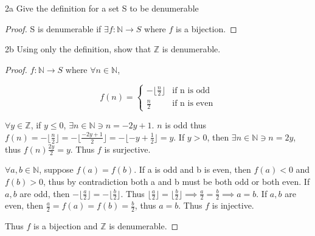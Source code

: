 \documentclass{article}
\newcommand{\Z}{\mathbb{Z}}
\newcommand{\N}{\mathbb{N}}
\newcommand{\floor}[1]{\lfloor{#1}\rfloor}
\begin{document}
\bigskip

\begin{PROB}{2a}\label{Problem 2a.}
    Give the definition for a set S to be denumerable
\end{PROB}
\begin{proof}
    S is denumerable if $\exists f: \N \to S$ where $f$ is a bijection.   
\end{proof}
\begin{claim}{2b}\label{Claim 2b.}
    Using only the definition, show that $\Z$ is denumerable.
\end{claim}
\begin{proof}
    $f: \N \to S$ where $\forall n \in \N$, 
    
    $$
    f(n) = \begin{cases}
        -\floor{\frac{n}{2}} & \text{if n is odd} \\
        \frac{n}{2} & \text{if n is even}
    \end{cases}
    $$ 


    $\forall y \in \Z$, if $y \leq 0$, $\exists n \in \N \ni n = -2y + 1$. $n$ is odd thus $f(n) = -\floor{\frac{n}{2}} = -\floor{\frac{-2y + 1}{2}} = -\floor{-y + \frac{1}{2}} = y$. If $y > 0$, then $\exists n \in \N \ni n = 2y$, thus $f(n)  \frac{2y}{2} = y$. Thus $f$ is surjective. 
    
    $\forall a, b \in \N$, suppose $f(a) = f(b)$. If a is odd and b is even, then $f(a) < 0$ and $f(b) > 0$, thus by contradiction both a and b must be both odd or both even. If $a, b$ are odd, then $-\floor{\frac{a}{2}} = -\floor{\frac{b}{2}}$. Thus $\floor{\frac{a}{2}} = \floor{\frac{b}{2}} \implies \frac{a}{2} = \frac{b}{2} \implies a = b$. If $a, b$ are even, then $\frac{a}{2} = f(a) = f(b) = \frac{b}{2}$, thus $a = b$. Thus $f$ is injective.
    
    Thus $f$ is a bijection and $\Z$ is denumerable. 
\end{proof}
\end{document}
